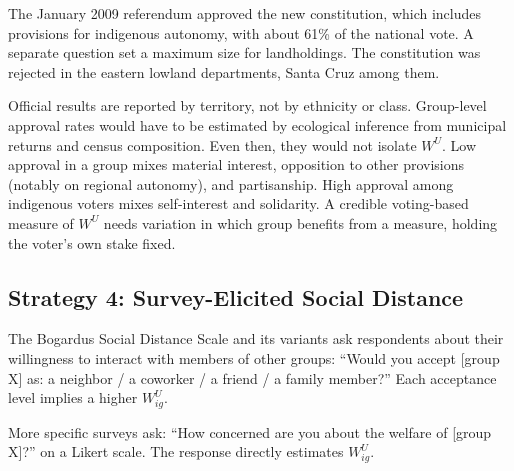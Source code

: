 \documentclass[../structural_economics_book.tex]{subfiles}
\begin{document}
\begin{example}\label{ch22:ex:referendum}
The January 2009 referendum approved the new constitution, which includes provisions for indigenous autonomy, with about 61\% of the national vote. A separate question set a maximum size for landholdings. The constitution was rejected in the eastern lowland departments, Santa Cruz among them. %

Official results are reported by territory, not by ethnicity or class. Group-level approval rates would have to be estimated by ecological inference from municipal returns and census composition. Even then, they would not isolate $W^U$. Low approval in a group mixes material interest, opposition to other provisions (notably on regional autonomy), and partisanship. High approval among indigenous voters mixes self-interest and solidarity. A credible voting-based measure of $W^U$ needs variation in which group benefits from a measure, holding the voter's own stake fixed.
\end{example}


\subsection{Strategy 4: Survey-Elicited Social Distance}

\begin{definition}\label{ch22:def:social_distance}
The Bogardus Social Distance Scale and its variants ask respondents about their willingness to interact with members of other groups: ``Would you accept [group X] as: a neighbor / a coworker / a friend / a family member?'' Each acceptance level implies a higher $W^U_{ig}$.

More specific surveys ask: ``How concerned are you about the welfare of [group X]?'' on a Likert scale. The response directly estimates $W^U_{ig}$.
\end{definition}
\end{document}
